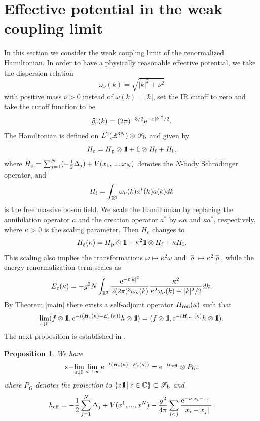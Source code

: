 \documentclass[12pt]{article}
\newtheorem{proposition}[theorem]{Proposition}
\providecommand{\bp}[1]{\begin{proposition}\label{#1}}
\providecommand{\ep}{\end{proposition}}
\def\bbbone{{\mathchoice {\rm 1\mskip-4mu l} {\rm 1\mskip-4mu l}
{\rm 1\mskip-4.5mu l} {\rm 1\mskip-5mu l}}}
\def\one{\bbbone}
\providecommand{\eq}[1]{\begin{equation}\label{#1}}
\providecommand{\en}{\end{equation}}
\providecommand{\BR}{{\mathbb{R}^3 }}
\providecommand{\CC}{{\mathbb{C}}}
\providecommand{\RR}{\mathbb{R}}
\providecommand{\hn}{H}%
\providecommand{\ffff}{{\mathscr{F}_{\rm b}}}
\providecommand{\add}{a^\ast}
\providecommand{\hf}{H_{\rm f}}
\providecommand{\half}{\frac{1}{2}}
\providecommand{\hi}{H_{\rm I}}
\providecommand{\hp}{H_{\rm p}}
\providecommand{\slim}{{\rm s}\!-\!\lim}
\providecommand{\vp}{{\widehat \varrho}}
\providecommand{\vpe}{{\widehat \varrho_\eps}}
\providecommand{\vp}{\mathop{\mathrm{{\varphi}}}\nolimits}
\providecommand{\e}{{\rm e}}
\providecommand{\1}{\mathbb{1}}
\providecommand{\eps}{\varepsilon}
\providecommand{\ren}{{\rm ren}}
\begin{document}
\section{Effective potential in the weak coupling limit}
In this section we consider the weak coupling limit of the renormalized Hamiltonian.
 In order to have a physically reasonable
effective potential, we take the dispersion relation
$$
\omega_\nu(k)=\sqrt{|k|^2+\nu^2}
$$
with positive mass $\nu>0$ instead of $\omega(k)=|k|$,  set the IR cutoff to zero and
take the cutoff function to be
$$
\vpe(k)= (2\pi)^{-3/2}\e^{-\eps|k|^2/2}.
$$
The Hamiltonian
is defined on $L^2(\RR^{3N})\otimes\ffff $ and given by
$$
\hn_\eps=\hp\otimes\one+\one\otimes\hf+\hi,
$$
where $\hp=\sum_{j=1}^N (-\half \Delta_j) +V(x_1,...,x_N)$ denotes the $N$-body Schr\"odinger operator, and
$$
\hf=\int_\BR \omega_\nu(k)\add(k) a(k)dk
$$
is the free massive boson field. We scale the Hamiltonian by replacing the annihilation operator $a$ and the
creation operator $\add$ by $\kappa a$ and $\kappa \add$, respectively, where $\kappa>0$ is the scaling
parameter. Then $\hn_\eps$ changes to
\eq{weak}
\hn_\eps(\kappa)=\hp\otimes \one +\kappa^2 \one\otimes\hf+\kappa \hi.
\en
This scaling also implies the transformations $\omega\mapsto \kappa^2 \omega$ and $\vp\mapsto \kappa^2\vp$,
while the energy renormalization term scales as
\eq{energy}
E_\eps(\kappa)=-g^2 N  \int_\BR \frac{\e^{-\eps |k|^2}}{2(2\pi)^3 \omega_\nu(k)}
\frac{\kappa^2}{\kappa^2\omega_\nu(k)+|k|^2/2} dk.
\en
By Theorem \ref{main} there exists
a self-adjoint operator $H_{\ren}(\kappa)$ such that
\eq{main2}
\lim_{\eps\downarrow 0} (f\otimes\one, \e^{-t(H_\eps(\kappa)-E_\eps(\kappa))}
h\otimes  \one)=(f\otimes\one, \e^{-tH_{\ren}(\kappa)}h\otimes \one).
\en
The next proposition is established in \cite{dav79,hir99}.
\bp{wcl}
We have
$$
\slim_{\eps\downarrow 0} \lim_{\kappa\to\infty} \e^{-t(\hn_\eps(\kappa)-E_\eps(\kappa))}=
\e^{-th_{\rm eff}}\otimes P_\Omega,
$$
where $P_\Omega$ denotes the projection to $\{z\one\,|\,z\in\CC\}\subset\ffff $ and
$$
h_{\rm eff}=-\half \sum_{j=1}^N \Delta_j + V(x^1,...,x^N)-\frac{g^2}{4\pi }\sum_{i<j}
\frac{\e^{-\nu|x_i-x_j|}}{|x_i-x_j|}.
$$
\ep
\end{document}
